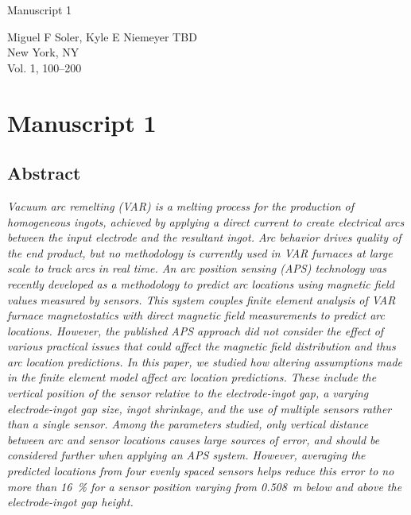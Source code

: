 \documentclass[onehalf,11pt]{beavtex}
\begin{document}
\phantom{}\newpage
\phantom{}\vfill
\begin{center}
\heading
Manuscript 1
\end{center}
\vfill
Miguel F Soler, Kyle E Niemeyer
\vfill\noindent
TBD\\
New York, NY\\
Vol. 1, 100--200
\vfill
\chapter{Manuscript 1}


\section{Abstract}
{\it 
Vacuum arc remelting (VAR) is a melting process for the production of homogeneous ingots, achieved by applying a direct current to create electrical arcs between the input electrode and the resultant ingot.
Arc behavior drives quality of the end product, but no methodology is currently used in VAR furnaces at large scale to track arcs in real time.
An arc position sensing (APS) technology was recently developed as a methodology to predict arc locations using magnetic field values measured by sensors.
This system couples finite element analysis of VAR furnace magnetostatics with direct magnetic field measurements to predict arc locations.
However, the published APS approach did not consider the effect of various practical issues that could affect the magnetic field distribution and thus arc location predictions.
In this paper, we studied how altering assumptions made in the finite element model affect arc location predictions.
These include the vertical position of the sensor relative to the electrode-ingot gap, a varying electrode-ingot gap size, ingot shrinkage, and the use of multiple sensors rather than a single sensor.
Among the parameters studied, only vertical distance between arc and sensor locations causes large sources of error, and should be considered further when applying an APS system.
However, averaging the predicted locations from four evenly spaced sensors helps reduce this error to no more than \SI{16}{\percent} for a sensor position varying from \SI{0.508}{\meter} below and above the electrode-ingot gap height.
}


\end{document}
